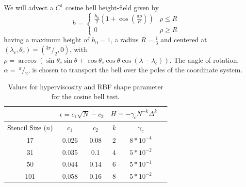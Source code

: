 \documentclass{report}
\begin{document}
We will advect a $C^1$ cosine bell height-field given by
\begin{equation*}
h  =
\begin{cases}
\frac{h_0}{2} (1 + \cos(\frac{\pi \rho}{R}))  & \rho \le R  \\
 0 &  \rho \geq R
\end{cases}
\end{equation*}
having a maximum height of $h_0 = 1$, a radius $R = \frac{1}{3}$ and centered at $(\lambda_c, \theta_c) = (^{3\pi}/_{2}, 0)$, with 
$\rho = \arccos( \sin \theta_{c} \sin \theta + \cos \theta_{c} \cos \theta \cos (\lambda - \lambda_{c}) )$.
The angle of rotation, $\alpha =\ ^{\pi}/_{2}$, is chosen to transport the bell over the poles of the coordinate system.

\begin{table}[ht!]
\caption{Values for hyperviscosity and RBF shape parameter for the cosine bell test. }
\begin{center}
\begin{tabular}{|c|c|c|c|c|c|}
\hline		     & \multicolumn{2}{c|}{$\epsilon = c_1 \sqrt{N} - c_2$} & \multicolumn{2}{c|}{$H = -\gamma_{c} N^{-k} \Delta^{k}$ } \\ \hline
Stencil Size ($n$) & $c_{1}$ & $c_{2}$ & $k$ & $\gamma_c$ \\ \hline
17 & 0.026 & 0.08 & 2 & $8 * 10^{-4}$ \\
31 & 0.035 & 0.1 & 4 & $5 * 10^{-2}$ \\
50 & 0.044 & 0.14 & 6 & $5 * 10^{-1}$ \\
101 & 0.058 & 0.16 & 8 & $5 * 10^{-2}$ \\ \hline
\end{tabular}
\end{center}
\label{tbl:cos_hv_params}
\end{table}
\end{document}
